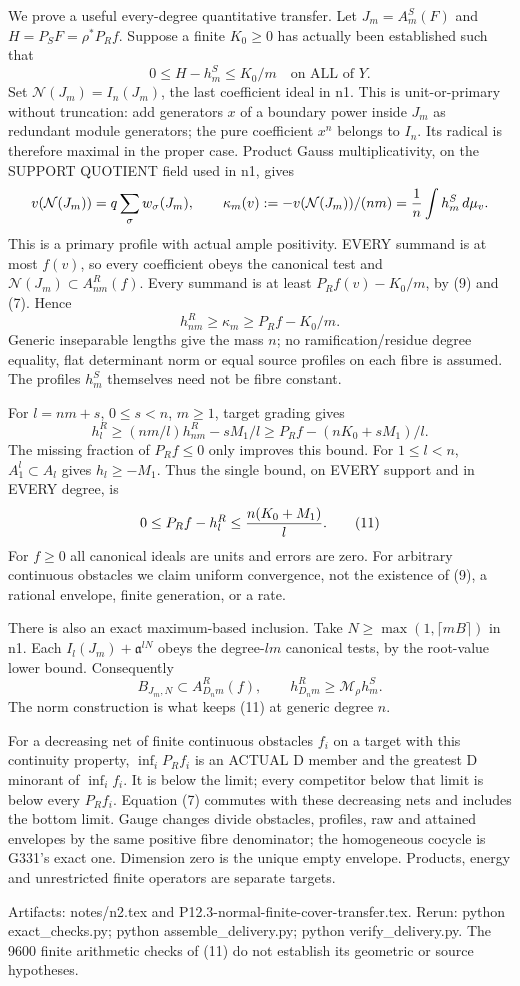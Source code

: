We prove a useful every-degree quantitative transfer. Let
$J_m=A_m^S(F)$ and $H=P_SF=\rho^*P_Rf$. Suppose a finite $K_0\ge0$
has actually been established such that
\[
        0\le H-h_m^S\le K_0/m \quad\text{on ALL of }Y.      \tag{9}
\]
Set $\mathcal N(J_m)=I_n(J_m)$, the last coefficient ideal in n1.
This is unit-or-primary without truncation: add generators $x$ of a
boundary power inside $J_m$ as redundant module generators; the pure
coefficient $x^n$ belongs to $I_n$. Its radical is therefore maximal
in the proper case. Product Gauss multiplicativity, on the SUPPORT
QUOTIENT field used in n1, gives
\[
 v(\mathcal N(J_m))=q\sum_{\sigma}w_\sigma(J_m),\qquad
 \kappa_m(v):=-v(\mathcal N(J_m))/(nm)
             ={1\over n}\int h_m^S\,d\mu_v.
\]
This is a primary profile with actual ample positivity. EVERY summand
is at most $f(v)$, so every coefficient obeys the canonical test and
$\mathcal N(J_m)\subset A_{nm}^R(f)$. Every summand is at least
$P_Rf(v)-K_0/m$, by (9) and (7). Hence
\[
        h_{nm}^R\ge\kappa_m\ge P_Rf-K_0/m.                 \tag{10}
\]
Generic inseparable lengths give the mass $n$; no ramification/residue
degree equality, flat determinant norm or equal source profiles on each
fibre is assumed. The profiles $h_m^S$ themselves need not be fibre
constant.

For $l=nm+s$, $0\le s<n$, $m\ge1$, target grading gives
\[
 h_l^R\ge (nm/l)h_{nm}^R-sM_1/l
       \ge P_Rf-(nK_0+sM_1)/l.
\]
The missing fraction of $P_Rf\le0$ only improves this bound.
For $1\le l<n$, $A_1^l\subset A_l$ gives $h_l\ge-M_1$.
Thus the single bound, on EVERY support and in EVERY degree, is
\[
           0\le P_Rf-h_l^R\le {n(K_0+M_1)\over l}.         \tag{11}
\]
For $f\ge0$ all canonical ideals are units and errors are zero.
For arbitrary continuous obstacles we claim uniform convergence, not
the existence of (9), a rational envelope, finite generation, or a rate.

There is also an exact maximum-based inclusion. Take
$N\ge\max(1,\lceil mB\rceil)$ in n1. Each
$I_l(J_m)+\mathfrak a^{lN}$ obeys the degree-$lm$ canonical tests,
by the root-value lower bound. Consequently
\[
 B_{J_m,N}\subset A_{D_nm}^R(f),\qquad
 h_{D_nm}^R\ge\mathcal M_\rho h_m^S.
\]
The norm construction is what keeps (11) at generic degree $n$.

For a decreasing net of finite continuous obstacles $f_i$ on a target
with this continuity property, $\inf_iP_Rf_i$ is an ACTUAL D member
and the greatest D minorant of $\inf_i f_i$. It is below the limit;
every competitor below that limit is below every $P_Rf_i$. Equation
(7) commutes with these decreasing nets and includes the bottom limit.
Gauge changes divide obstacles, profiles, raw and attained envelopes
by the same positive fibre denominator; the homogeneous cocycle is
G331's exact one. Dimension zero is the unique empty envelope. Products,
energy and unrestricted finite operators are separate targets.

Artifacts: notes/n2.tex and P12.3-normal-finite-cover-transfer.tex.
Rerun: python exact\_checks.py; python assemble\_delivery.py;
python verify\_delivery.py. The 9600 finite arithmetic checks of (11)
do not establish its geometric or source hypotheses.
